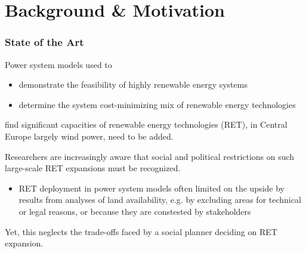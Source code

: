 \documentclass[aspectratio=1610, xcolor=dvipsnames,handout]{beamer} %
\begin{document}
    \section{Background \& Motivation}\label{sec:background}
    \begin{frame}
        \frametitle{State of the Art}
        Power system models used to
        \begin{itemize}
            \item demonstrate the feasibility of highly renewable energy systems
            \item determine the system cost-minimizing mix of renewable energy technologies
        \end{itemize}
        find significant capacities of renewable energy technologies (RET), in Central Europe largely wind power,
        need to be added.
        \medskip

        Researchers are increasingly aware that social and political restrictions on such large-scale RET expansions
        must be recognized.
        \begin{itemize}
            \item RET deployment in power system models often limited on the upside by results from analyses of land
            availability, e.g. by excluding areas for technical or legal reasons, or because they are constested by
            stakeholders
        \end{itemize}
        \medskip

        Yet, this neglects the trade-offs faced by a social planner deciding on RET expansion.
    \end{frame}
\end{document}
